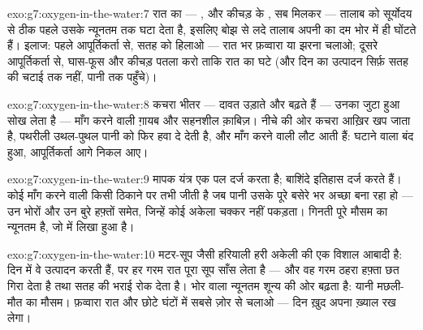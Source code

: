 \begin{solution}{exo:g7:oxygen-in-the-water:7}
रात का  --- ,  और कीचड़ के , सब मिलकर --- तालाब को
सूर्योदय से ठीक पहले उसके न्यूनतम तक घटा देता है, इसलिए बोझ से लदे तालाब
अपनी  का दम भोर में ही घोंटते हैं। इलाज: पहले आपूर्तिकर्ता से,
सतह को हिलाओ --- रात भर फ़व्वारा या झरना चलाओ; दूसरे आपूर्तिकर्ता से,
घास-फूस और कीचड़ पतला करो ताकि रात का  घटे (और दिन का उत्पादन
सिर्फ़ सतह की चटाई तक नहीं, पानी तक पहुँचे)।
\end{solution}

\begin{solution}{exo:g7:oxygen-in-the-water:8}
कचरा भीतर ---  दावत उड़ाते और बढ़ते हैं --- उनका जुटा हुआ 
 सोख लेता है --- माँग करने वाली  ग़ायब और सहनशील
क़ाबिज़। नीचे की ओर कचरा आख़िर खप जाता है, पथरीली उथल-पुथल पानी को फिर
हवा दे देती है, और माँग करने वाली  लौट आती हैं: घटाने वाला बंद
हुआ, आपूर्तिकर्ता आगे निकल आए।
\end{solution}

\begin{solution}{exo:g7:oxygen-in-the-water:9}
मापक यंत्र एक पल दर्ज करता है; बाशिंदे इतिहास दर्ज करते हैं। कोई माँग
करने वाली  किसी ठिकाने पर तभी जीती है जब पानी उसके पूरे बसेरे भर
अच्छा बना रहा हो --- उन भोरों और उन बुरे हफ़्तों समेत, जिन्हें कोई
अकेला चक्कर नहीं पकड़ता। गिनती पूरे मौसम का न्यूनतम है, जो  में
लिखा हुआ है।
\end{solution}

\begin{solution}{exo:g7:oxygen-in-the-water:10}
मटर-सूप जैसी हरियाली हरी अकेली  की एक विशाल आबादी है: दिन में
वे उत्पादन करती हैं, पर हर गरम रात पूरा सूप साँस लेता है --- और वह गरम
ठहरा हफ़्ता छत गिरा देता है तथा सतह की भराई रोक देता है। भोर वाला
न्यूनतम शून्य की ओर बढ़ता है: यानी मछली-मौत का मौसम। फ़व्वारा रात और
छोटे घंटों में सबसे ज़ोर से चलाओ --- दिन ख़ुद अपना ख़्याल रख लेगा।
\end{solution}

